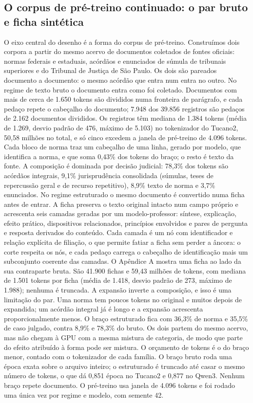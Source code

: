 \documentclass{IOS-Book-Article}
\begin{document}
\subsection{O corpus de pré-treino continuado: o par bruto e ficha sintética}
O eixo central do desenho é a forma do corpus de pré-treino. Construímos dois corpora a partir do mesmo acervo de documentos coletados de fontes oficiais: normas federais e estaduais, acórdãos e enunciados de súmula de tribunais superiores e do Tribunal de Justiça de São Paulo. Os dois são pareados documento a documento: o mesmo acórdão que entra num entra no outro.
No regime de texto bruto o documento entra como foi coletado. Documentos com mais de cerca de 1.650 tokens são divididos numa fronteira de parágrafo, e cada pedaço repete o cabeçalho do documento; 7.948 dos 39.856 registros são pedaços de 2.162 documentos divididos. Os registros têm mediana de 1.384 tokens (média de 1.269, desvio padrão de 476, máximo de 5.103) no tokenizador do Tucano2, 50,58 milhões no total, e só cinco excedem a janela de pré-treino de 4.096 tokens. Cada bloco de norma traz um cabeçalho de uma linha, gerado por modelo, que identifica a norma, e que soma 0,43\% dos tokens do braço; o resto é texto da fonte. A composição é dominada por decisão judicial: 78,3\% dos tokens são acórdãos integrais, 9,1\% jurisprudência consolidada (súmulas, teses de repercussão geral e de recurso repetitivo), 8,9\% texto de norma e 3,7\% enunciados.
No regime estruturado o mesmo documento é convertido numa ficha antes de entrar. A ficha preserva o texto original intacto num campo próprio e acrescenta seis camadas geradas por um modelo-professor: síntese, explicação, efeito prático, dispositivos relacionados, princípios envolvidos e pares de pergunta e resposta derivados do conteúdo. Cada camada é um nó com identificador e relação explícita de filiação, o que permite fatiar a ficha sem perder a âncora: o corte respeita os nós, e cada pedaço carrega o cabeçalho de identificação mais um subconjunto coerente das camadas. O Apêndice A mostra uma ficha ao lado da sua contraparte bruta. São 41.900 fichas e 59,43 milhões de tokens, com mediana de 1.501 tokens por ficha (média de 1.418, desvio padrão de 273, máximo de 1.988); nenhuma é truncada.
A expansão inverte a composição, e isso é uma limitação do par. Uma norma tem poucos tokens no original e muitos depois de expandida; um acórdão integral já é longo e a expansão acrescenta proporcionalmente menos. O braço estruturado fica com 36,3\% de norma e 35,5\% de caso julgado, contra 8,9\% e 78,3\% do bruto. Os dois partem do mesmo acervo, mas não chegam à GPU com a mesma mistura de categoria, de modo que parte do efeito atribuído à forma pode ser mistura.
O orçamento de tokens é o do braço menor, contado com o tokenizador de cada família. O braço bruto roda uma época exata sobre o arquivo inteiro; o estruturado é truncado até casar o mesmo número de tokens, o que dá 0,851 época no Tucano2 e 0,877 no Qwen3. Nenhum braço repete documento. O pré-treino usa janela de 4.096 tokens e foi rodado uma única vez por regime e modelo, com semente 42.
\end{document}
